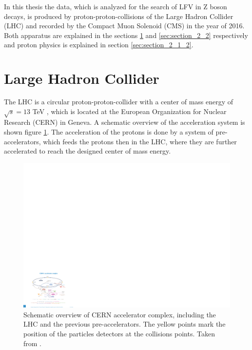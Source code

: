 In this thesis the data, which is analyzed for the search of \gls{LFV} in Z boson decays, is produced by proton-proton-collisions of the Large Hadron Collider (\gls{LHC}) \cite{LHC} and recorded by the Compact Muon Solenoid (\gls{CMS}) \cite{CMS} in the year of 2016. Both apparatus are explained in the sections \ref{sec:section_2_1} and \ref{sec:section_2_2} respectively and proton physics is explained in section \ref{sec:section_2_1_2}.


\section{Large Hadron Collider}
\label{sec:section_2_1}

The \gls{LHC} is a circular proton-proton-collider with a center of mass energy of $\sqrt{s} = 13$ TeV \cite{LHC2}, which is located at the European Organization for Nuclear Research (\gls{CERN}) in Geneva. A schematic overview of the acceleration system is shown figure \ref{fig:fig_2_1}. The acceleration of the protons is done by a system of pre-accelerators, which feeds the protons then in the \gls{LHC}, where they are further accelerated to reach the designed center of mass energy. \\

\begin{figure}[ht]
	\centering
	\includegraphics[width=1.0\textwidth]{pictures/LHC.pdf}

	\caption[Schematic overview of CERN accelerator complex]{Schematic overview of \gls{CERN} accelerator complex, including the \gls{LHC} and the previous pre-accelerators. The yellow points mark the position of the particles detectors at the collisions points. Taken from \cite{LHCACCL}.}
	\label{fig:fig_2_1}
\end{figure}

